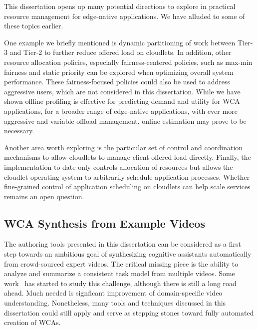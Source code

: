This dissertation opens up many potential directions to explore in practical
resource management for edge-native applications. We have alluded to some of
these topics earlier. 

One example we briefly mentioned is dynamic partitioning of work between Tier-3
and Tier-2 to further reduce offered load on cloudlets.  In addition, other
resource allocation policies, especially fairness-centered policies, such as
max-min fairness and static priority can be explored when optimizing overall
system performance. These fairness-focused policies could also be used to
address aggressive users, which are not considered in this dissertation.  While
we have shown offline profiling is effective for predicting demand and utility
for WCA applications, for a broader range of edge-native applications, with ever
more aggressive and variable offload management, online estimation may prove to
be necessary. 

Another area worth exploring is the particular set of control and coordination
mechanisms to allow cloudlets to manage client-offered load directly. Finally,
the implementation to date only controls allocation of resources but allows the
cloudlet operating system to arbitrarily schedule application processes. Whether
fine-grained control of application scheduling on cloudlets can help scale
services remains an open question.


\subsection{WCA Synthesis from Example Videos}

The authoring tools presented in this dissertation can be considered as a first
step towards an ambitious goal of synthesizing cognitive assistants
automatically from crowd-sourced expert videos. The critical missing piece is
the ability to analyze and summarize a consistent task model from multiple
videos. Some work~\cite{pham2018unsupervised} has started to study this
challenge, although there is still a long road ahead. Much needed is signficant
improvement of domain-specific video understanding. Nonetheless, many tools and
techniques discussed in this dissertation could still apply and serve as
stepping stones toward fully automated creation of WCAs. 